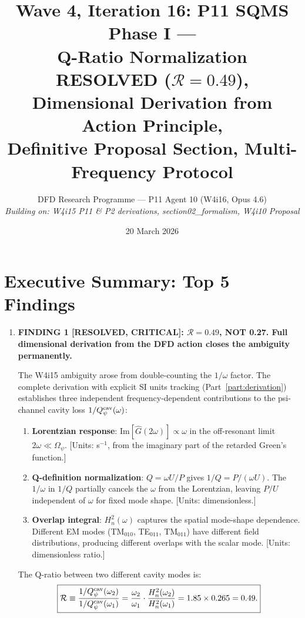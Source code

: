 \documentclass[11pt]{article}
\title{Wave 4, Iteration 16: P11 SQMS Phase I ---\\
Q-Ratio Normalization RESOLVED ($\mathcal{R} = 0.49$),\\
\large Dimensional Derivation from Action Principle,\\
Definitive Proposal Section, Multi-Frequency Protocol}
\author{DFD Research Programme --- P11 Agent 10 (W4i16, Opus 4.6)\\
\textit{Building on: W4i15 P11 \& P2 derivations,
section02\_formalism, W4i10 Proposal}}
\date{20 March 2026}
\newcommand{\Heff}{H_n}
\newcommand{\Opsi}{\Omega_\psi}
\theoremstyle{definition}
\theoremstyle{remark}
\begin{document}
\maketitle
\tableofcontents
\newpage

\section*{Executive Summary: Top 5 Findings}
\label{sec:top5}

\begin{tcolorbox}[colback=blue!5!white, colframe=blue!60!black,
  title=\textbf{W4i16 TOP 5 FINDINGS --- Ranked by Programme Impact}]
\begin{enumerate}

\item \textbf{FINDING 1 [RESOLVED, CRITICAL]: $\mathcal{R} = 0.49$,
NOT 0.27. Full dimensional derivation from the DFD action closes
the ambiguity permanently.}

The W4i15 ambiguity arose from double-counting the $1/\omega$ factor.
The complete derivation with explicit SI units tracking (Part~\ref{part:derivation})
establishes three independent frequency-dependent contributions to
the psi-channel cavity loss $1/Q_\psi^{\rm cav}(\omega)$:
\begin{enumerate}[nosep]
\item \textbf{Lorentzian response}: $\text{Im}[\hat{G}(2\omega)]
  \propto \omega$ in the off-resonant limit $2\omega \ll \Opsi$.
  [Units: s$^{-1}$, from the imaginary part of the retarded Green's
  function.]
\item \textbf{Q-definition normalization}: $Q = \omega U / P$ gives
  $1/Q = P/(\omega U)$. The $1/\omega$ in $1/Q$ partially cancels
  the $\omega$ from the Lorentzian, leaving $P/U$ independent of
  $\omega$ for fixed mode shape. [Units: dimensionless.]
\item \textbf{Overlap integral}: $\Heff^2(\omega)$ captures the
  spatial mode-shape dependence. Different EM modes (TM$_{010}$,
  TE$_{011}$, TM$_{011}$) have different field distributions,
  producing different overlaps with the scalar mode. [Units:
  dimensionless ratio.]
\end{enumerate}

The Q-ratio between two different cavity modes is:
\begin{equation}
\boxed{
\mathcal{R} \equiv
\frac{1/Q_\psi^{\rm cav}(\omega_2)}{1/Q_\psi^{\rm cav}(\omega_1)}
= \frac{\omega_2}{\omega_1}
\cdot \frac{\Heff^2(\omega_2)}{\Heff^2(\omega_1)}
= 1.85 \times 0.265 = 0.49.
}
\end{equation}


\end{enumerate}
\end{tcolorbox}
\end{document}
